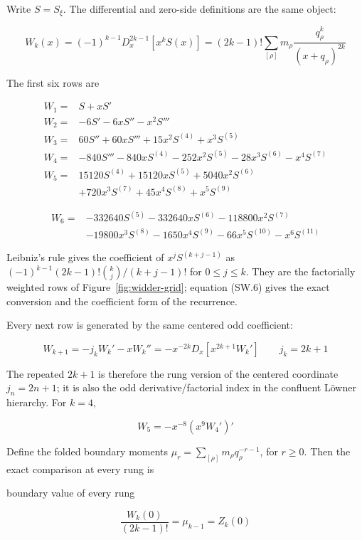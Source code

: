 \documentclass[
  11pt,
]{book}
\newcommand{\figref}[1]{Figure~\ref{#1}}
\begin{document}
Write \(S=S_\xi\). The differential and zero-side definitions are the
same object:

\[
\boxed{
W_k(x)=(-1)^{k-1}D_x^{2k-1}[x^kS(x)]
=(2k-1)!\sum_{[\rho]}m_\rho
\frac{q_\rho^k}{(x+q_\rho)^{2k}}}
\tag{12.1}
\]

The first six rows are

\[
\begin{aligned}
W_1={}&S+xS'\\
W_2={}&-6S'-6xS''-x^2S'''\\
W_3={}&60S''+60xS'''+15x^2S^{(4)}+x^3S^{(5)}\\
W_4={}&-840S'''-840xS^{(4)}-252x^2S^{(5)}
-28x^3S^{(6)}-x^4S^{(7)}\\
W_5={}&15120S^{(4)}+15120xS^{(5)}+5040x^2S^{(6)}\\
&+720x^3S^{(7)}+45x^4S^{(8)}+x^5S^{(9)}
\end{aligned}
\tag{12.2}
\]

\[
\begin{aligned}
W_6={}&-332640S^{(5)}-332640xS^{(6)}-118800x^2S^{(7)}\\
&-19800x^3S^{(8)}-1650x^4S^{(9)}-66x^5S^{(10)}-x^6S^{(11)}
\end{aligned}
\tag{12.2a}
\]

Leibniz's rule gives the coefficient of \(x^jS^{(k+j-1)}\) as
\((-1)^{k-1}(2k-1)!\binom{k}{j}/(k+j-1)!\) for \(0\le j\le k\). They are
the factorially weighted rows of \figref{fig:widder-grid}; equation
(SW.6) gives the exact conversion and the coefficient form of the
recurrence.

Every next row is generated by the same centered odd coefficient:

\[
\boxed{
W_{k+1}=-j_kW_k'-xW_k''
=-x^{-2k}D_x\!\left[x^{2k+1}W_k'\right]
\qquad j_k=2k+1}
\tag{12.3}
\]

The repeated \(2k+1\) is therefore the rung version of the centered
coordinate \(j_n=2n+1\); it is also the odd derivative/factorial index
in the confluent Löwner hierarchy. For \(k=4\),

\[
\boxed{W_5=-x^{-8}(x^9W_4')'}
\tag{12.4}
\]

Define the folded boundary moments
\(\mu_r=\sum_{[\rho]}m_\rho q_\rho^{-r-1}\), for \(r\ge0\). Then the
exact comparison at every rung is

\begin{tnclosed}{boundary value of every rung}

\[
\boxed{\frac{W_k(0)}{(2k-1)!}=\mu_{k-1}=Z_k(0)}
\tag{12.4a}
\]

\end{tnclosed}
\end{document}
